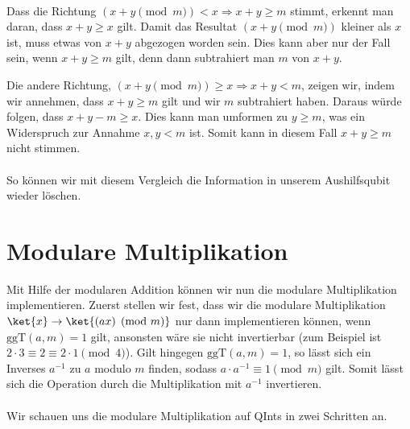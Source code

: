 \paragraph{}

Dass die Richtung $({x + y \pmod{m}}) < x \Rightarrow x + y \geq m$ stimmt, erkennt man daran, dass $x + y \geq x$ gilt. Damit das Resultat ${(x + y \pmod{m})}$ kleiner als $x$ ist, muss etwas von $x + y$ abgezogen worden sein. Dies kann aber nur der Fall sein, wenn $x + y \geq m$ gilt, denn dann subtrahiert man $m$ von $x + y$.

Die andere Richtung, $(x + y \pmod{m}) \geq x \Rightarrow x + y < m$, zeigen wir, indem wir annehmen, dass $x + y \geq m$ gilt und wir $m$ subtrahiert haben. Daraus würde folgen, dass $x + y - m \geq x$. Dies kann man umformen zu $y \geq m$, was ein Widerspruch zur Annahme $x, y < m$ ist. Somit kann in diesem Fall $x + y \geq m$ nicht stimmen.

\paragraph{}

\noindent So können wir mit diesem Vergleich die Information in unserem Aushilfsqubit wieder löschen.

\section{Modulare Multiplikation}
Mit Hilfe der modularen Addition können wir nun die modulare Multiplikation implementieren. Zuerst stellen wir fest, dass wir die modulare Multiplikation $\ket{x} \rightarrow \ket{(ax) \pmod{m}}$ nur dann implementieren können, wenn $\text{ggT}(a, m) = 1$ gilt, ansonsten wäre sie nicht invertierbar (zum Beispiel ist $2\cdot 3 \equiv 2 \equiv 2\cdot 1 \pmod{4}$). Gilt hingegen $\text{ggT}(a, m) = 1$, so lässt sich ein Inverses $a^{-1}$ zu $a$ modulo $m$ finden, sodass $a\cdot a^{-1} \equiv 1 \pmod{m}$ gilt. Somit lässt sich die Operation durch die Multiplikation mit $a^{-1}$ invertieren.

\paragraph{}

Wir schauen uns die modulare Multiplikation auf QInts in zwei Schritten an.

